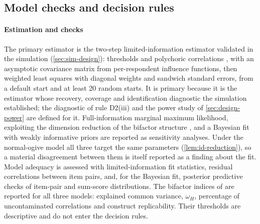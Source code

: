 \subsection{Model checks and decision rules}\label{sec:design-decisions}

\paragraph{Estimation and checks}
The primary estimator is the two-step limited-information estimator validated in the simulation (\cref{sec:sim-design}): thresholds and polychoric correlations \citep{olsson1979}, with an asymptotic covariance matrix from per-respondent influence functions, then weighted least squares with diagonal weights and sandwich standard errors, from a default start and at least 20 random starts. It is primary because it is the estimator whose recovery, coverage and identification diagnostic the simulation established; the diagnostic of rule D2(iii) and the power study of \cref{sec:design-power} are defined for it. Full-information marginal maximum likelihood, exploiting the dimension reduction of the bifactor structure \citep{gibbons1992}, and a Bayesian fit with weakly informative priors \citep{gelman2013} are reported as sensitivity analyses. Under the normal-ogive model all three target the same parameters (\cref{lem:id-reduction}), so a material disagreement between them is itself reported as a finding about the fit. Model adequacy is assessed with limited-information fit statistics, residual correlations between item pairs, and, for the Bayesian fit, posterior predictive checks of item-pair and sum-score distributions. The bifactor indices of \citet{rodriguez2016} are reported for all three models: explained common variance, $\omega_H$, percentage of uncontaminated correlations and construct replicability. Their thresholds are descriptive and do not enter the decision rules.

